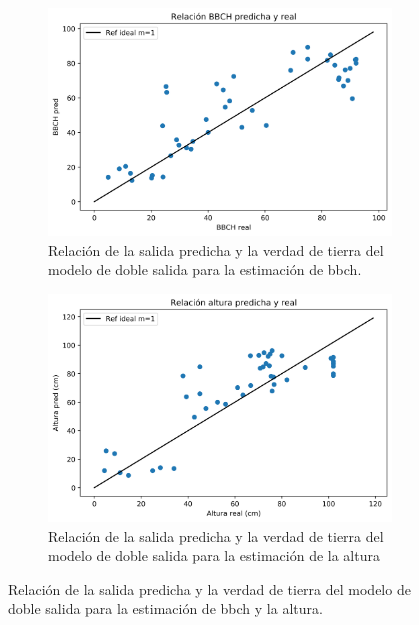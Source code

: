 \begin{figure}[H]
\centering
\begin{subfigure}{\textwidth}
  \centering
  \includegraphics[width=0.95\linewidth]{archivos/tfg/Mean/TEST_PARC_RECTA_bh}
  \caption{Relación de la salida predicha y la verdad de tierra del modelo de doble salida para la estimación de \gls{bbch}. \label{fig:rel_bh_b}}
\end{subfigure}
\begin{subfigure}{\textwidth}
  \centering
  \includegraphics[width=0.95\linewidth]{archivos/tfg/Mean/TEST_PARC_RECTA_bh_H}
  \caption{Relación de la salida predicha y la verdad de tierra del modelo de doble salida para la estimación de la altura\label{fig:rel_bh_h}}
\end{subfigure}
\caption{Relación de la salida predicha y la verdad de tierra del modelo de doble salida para la estimación de \gls{bbch} y la altura. \label{fig:rel_bh}}
\end{figure}

